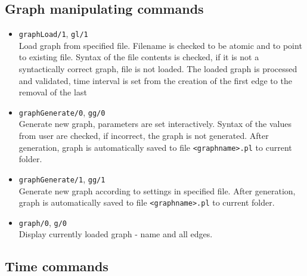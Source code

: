 \documentclass[11pt, a4paper]{article}
\newcommand{\pl}[1]{\texttt{#1}} %
\theoremstyle{plain}
\theoremstyle{definition}
\theoremstyle{remark}
\begin{document}
\subsection{Graph manipulating commands}
\begin{itemize}
\item \pl{graphLoad/1}, \pl{gl/1} \\
Load graph from specified file. Filename is checked to be atomic and to point to existing file.
Syntax of the file contents is checked, if it is not a syntactically correct graph, file is not loaded.
The loaded graph is processed and validated, time interval is set from the creation of the first edge
to the removal of the last

\item \pl{graphGenerate/0}, \pl{gg/0} \\
Generate new graph, parameters are set interactively. 
Syntax  of the values from user are checked, if incorrect, the graph is not generated. 
After generation, graph is automatically saved to file \pl{<graphname>.pl} to current folder.

\item \pl{graphGenerate/1}, \pl{gg/1} \\
Generate new graph according to settings in specified file. 
After generation, graph is automatically saved to file \pl{<graphname>.pl} to current folder.

\item \pl{graph/0}, \pl{g/0} \\
Display currently loaded graph - name and all edges.
\end{itemize}

\subsection{Time commands}
\end{document}
